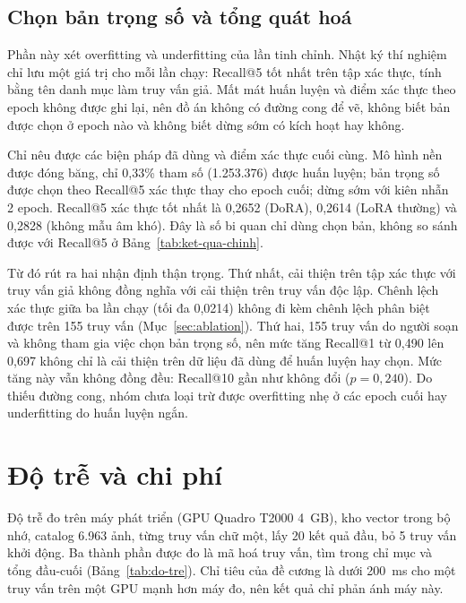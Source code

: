 \subsection{Chọn bản trọng số và tổng quát hoá}
\label{sec:tong-quat-hoa}

Phần này xét overfitting và underfitting của lần tinh chỉnh. Nhật ký thí nghiệm chỉ lưu một giá trị cho mỗi lần chạy: Recall@5 tốt nhất trên tập xác thực, tính bằng tên danh mục làm truy vấn giả. Mất mát huấn luyện và điểm xác thực theo epoch không được ghi lại, nên đồ án không có đường cong để vẽ, không biết bản được chọn ở epoch nào và không biết dừng sớm có kích hoạt hay không.

Chỉ nêu được các biện pháp đã dùng và điểm xác thực cuối cùng. Mô hình nền được đóng băng, chỉ 0,33\% tham số (1.253.376) được huấn luyện; bản trọng số được chọn theo Recall@5 xác thực thay cho epoch cuối; dừng sớm với kiên nhẫn 2 epoch. Recall@5 xác thực tốt nhất là 0,2652 (DoRA), 0,2614 (LoRA thường) và 0,2828 (không mẫu âm khó). Đây là số bi quan chỉ dùng chọn bản, không so sánh được với Recall@5 ở Bảng~\ref{tab:ket-qua-chinh}.

Từ đó rút ra hai nhận định thận trọng. Thứ nhất, cải thiện trên tập xác thực với truy vấn giả không đồng nghĩa với cải thiện trên truy vấn độc lập. Chênh lệch xác thực giữa ba lần chạy (tối đa 0,0214) không đi kèm chênh lệch phân biệt được trên 155 truy vấn (Mục~\ref{sec:ablation}). Thứ hai, 155 truy vấn do người soạn và không tham gia việc chọn bản trọng số, nên mức tăng Recall@1 từ 0,490 lên 0,697 không chỉ là cải thiện trên dữ liệu đã dùng để huấn luyện hay chọn. Mức tăng này vẫn không đồng đều: Recall@10 gần như không đổi ($p = 0{,}240$). Do thiếu đường cong, nhóm chưa loại trừ được overfitting nhẹ ở các epoch cuối hay underfitting do huấn luyện ngắn.

\section{Độ trễ và chi phí}
\label{sec:danh-gia-dau-ra}

Độ trễ đo trên máy phát triển (GPU Quadro T2000 4~GB), kho vector trong bộ nhớ, catalog 6.963 ảnh, từng truy vấn chữ một, lấy 20 kết quả đầu, bỏ 5 truy vấn khởi động. Ba thành phần được đo là mã hoá truy vấn, tìm trong chỉ mục và tổng đầu-cuối (Bảng~\ref{tab:do-tre}). Chỉ tiêu của đề cương là dưới 200~ms cho một truy vấn trên một GPU mạnh hơn máy đo, nên kết quả chỉ phản ánh máy này.

